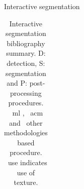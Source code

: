 \begin{frame}
\begin{block}{Interactive segmentation}
\begin{table}[h]
\begin{tabular}{r|l|m{.1cm}m{.1cm}m{.1cm}|p{4cm}}
 
 \end{tabular}
 \caption{{\tiny Interactive segmentation bibliography summary. D: detection, S: segmentation and P: post-processing procedures. 
 				\mlOne~\ac{ml} ,  \acmOne~\ac{acm} and \otherOne~other methodologies based procedure. \textureOne~use indicates use of texture. }}
\end{table}
\vspace{-5pt}
\end{block}
\end{frame}



